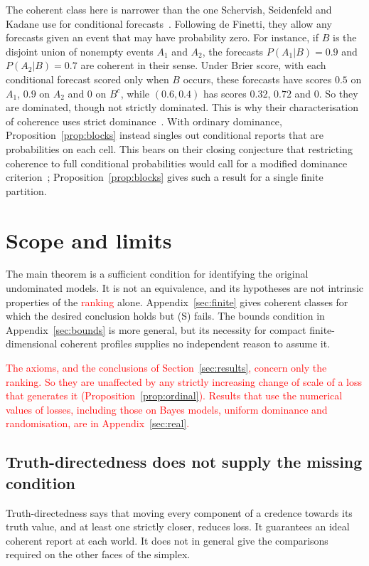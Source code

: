 \documentclass[11pt]{article}
\theoremstyle{definition}
\theoremstyle{remark}
\begin{document}
The coherent class here is narrower than the one Schervish, Seidenfeld and Kadane use for conditional forecasts~\cite{SSK09}. Following de Finetti, they allow any forecasts given an event that may have probability zero. For instance, if $B$ is the disjoint union of nonempty events $A_1$ and $A_2$, the forecasts $P(A_1|B)=0.9$ and $P(A_2|B)=0.7$ are coherent in their sense. Under Brier score, with each conditional forecast scored only when $B$ occurs, these forecasts have scores $0.5$ on $A_1$, $0.9$ on $A_2$ and $0$ on $B^c$, while $(0.6,0.4)$ has scores $0.32$, $0.72$ and $0$. So they are dominated, though not strictly dominated. This is why their characterisation of coherence uses strict dominance~\cite[Theorem~1]{SSK09}. With ordinary dominance, Proposition~\ref{prop:blocks} instead singles out conditional reports that are probabilities on each cell. This bears on their closing conjecture that restricting coherence to full conditional probabilities would call for a modified dominance criterion~\cite[Section~6]{SSK09}; Proposition~\ref{prop:blocks} gives such a result for a single finite partition.



\section{Scope and limits}\label{sec:scope}
The main theorem is a sufficient condition for identifying the original undominated models. It is not an equivalence, and its hypotheses are not intrinsic properties of the \textcolor{red}{ranking} alone. Appendix~\ref{sec:finite} gives coherent classes for which the desired conclusion holds but (S) fails. The bounds condition in Appendix~\ref{sec:bounds} is more general, but its necessity for compact finite-dimensional coherent profiles supplies no independent reason to assume it.

\textcolor{red}{The axioms, and the conclusions of Section~\ref{sec:results}, concern only the ranking. So they are unaffected by any strictly increasing change of scale of a loss that generates it (Proposition~\ref{prop:ordinal}). Results that use the numerical values of losses, including those on Bayes models, uniform dominance and randomisation, are in Appendix~\ref{sec:real}.}

\subsection{Truth-directedness does not supply the missing condition}
Truth-directedness says that moving every component of a credence towards its truth value, and at least one strictly closer, reduces loss. It guarantees an ideal coherent report at each world. It does not in general give the comparisons required on the other faces of the simplex.
\end{document}
